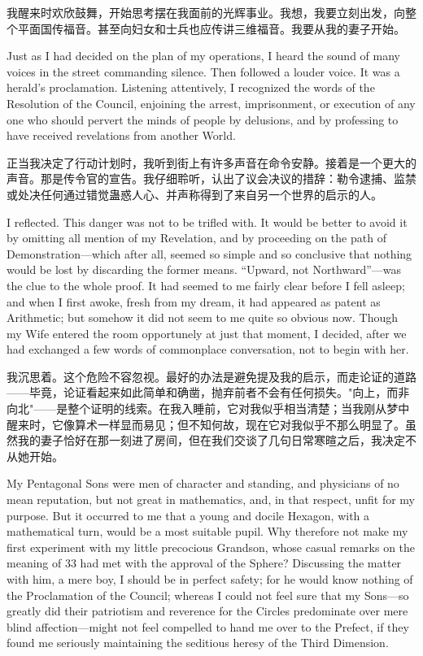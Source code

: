 \documentclass[12pt,UTF8]{ctexbook}
\begin{document}
我醒来时欢欣鼓舞，开始思考摆在我面前的光辉事业。我想，我要立刻出发，向整个平面国传福音。甚至向妇女和士兵也应传讲三维福音。我要从我的妻子开始。

Just as I had decided on the plan of my operations, I heard the sound of many voices in the street commanding silence. Then followed a louder voice. It was a herald's proclamation. Listening attentively, I recognized the words of the Resolution of the Council, enjoining the arrest, imprisonment, or execution of any one who should pervert the minds of people by delusions, and by professing to have received revelations from another World.

正当我决定了行动计划时，我听到街上有许多声音在命令安静。接着是一个更大的声音。那是传令官的宣告。我仔细聆听，认出了议会决议的措辞：勒令逮捕、监禁或处决任何通过错觉蛊惑人心、并声称得到了来自另一个世界的启示的人。

I reflected. This danger was not to be trifled with. It would be better to avoid it by omitting all mention of my Revelation, and by proceeding on the path of Demonstration---which after all, seemed so simple and so conclusive that nothing would be lost by discarding the former means. ``Upward, not Northward''---was the clue to the whole proof. It had seemed to me fairly clear before I fell asleep; and when I first awoke, fresh from my dream, it had appeared as patent as Arithmetic; but somehow it did not seem to me quite so obvious now. Though my Wife entered the room opportunely at just that moment, I decided, after we had exchanged a few words of commonplace conversation, not to begin with her.

我沉思着。这个危险不容忽视。最好的办法是避免提及我的启示，而走论证的道路——毕竟，论证看起来如此简单和确凿，抛弃前者不会有任何损失。"向上，而非向北"——是整个证明的线索。在我入睡前，它对我似乎相当清楚；当我刚从梦中醒来时，它像算术一样显而易见；但不知何故，现在它对我似乎不那么明显了。虽然我的妻子恰好在那一刻进了房间，但在我们交谈了几句日常寒暄之后，我决定不从她开始。

My Pentagonal Sons were men of character and standing, and physicians of no mean reputation, but not great in mathematics, and, in that respect, unfit for my purpose. But it occurred to me that a young and docile Hexagon, with a mathematical turn, would be a most suitable pupil. Why therefore not make my first experiment with my little precocious Grandson, whose casual remarks on the meaning of 33 had met with the approval of the Sphere? Discussing the matter with him, a mere boy, I should be in perfect safety; for he would know nothing of the Proclamation of the Council; whereas I could not feel sure that my Sons---so greatly did their patriotism and reverence for the Circles predominate over mere blind affection---might not feel compelled to hand me over to the Prefect, if they found me seriously maintaining the seditious heresy of the Third Dimension.
\end{document}
